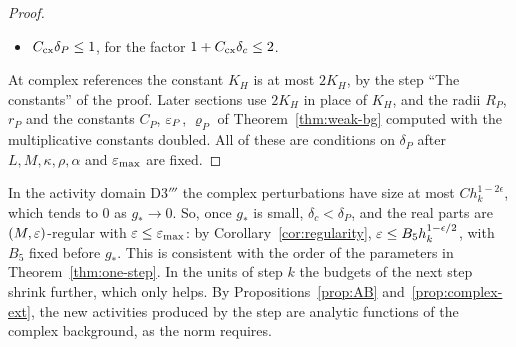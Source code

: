 \begin{proof}
\begin{itemize}
\item $C_{\rm cx}\delta_P\le1$, for the factor $1+C_{\rm cx}\delta_c\le2$.
\end{itemize}
At complex references the constant $K_H$ is at most $2K_H$, by the step ``The constants'' of the proof. Later sections use $2K_H$ in place of $K_H$, and the radii $R_P$, $r_P$ and the constants $C_P$, $\varepsilon_P$, $\varrho_P$ of Theorem~\ref{thm:weak-bg} computed with the multiplicative constants doubled.
All of these are conditions on $\delta_P$ after $L,M,\kappa,\rho,\alpha$ and $\varepsilon_{\max}$ are fixed.
\end{proof}

\begin{remark}
In the activity domain D3$'''$ the complex perturbations have size at most $Ch_k^{1-2\epsilon}$, which tends to $0$ as $g_*\to0$. So, once $g_*$ is small, $\delta_c<\delta_P$, and the real parts are $(M,\varepsilon)$-regular with $\varepsilon\le\varepsilon_{\max}$: by Corollary~\ref{cor:regularity}, $\varepsilon\le B_5h_k^{1-\epsilon/2}$, with $B_5$ fixed before $g_*$. This is consistent with the order of the parameters in Theorem~\ref{thm:one-step}. In the units of step $k$ the budgets of the next step shrink further, which only helps. By Propositions~\ref{prop:AB} and~\ref{prop:complex-ext}, the new activities produced by the step are analytic functions of the complex background, as the norm requires.
\end{remark}
